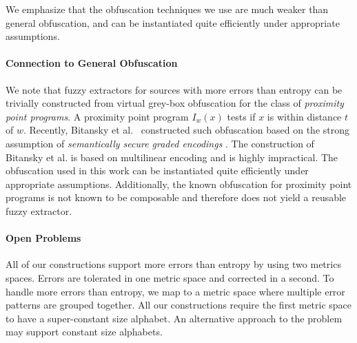 \documentclass[11pt]{article}
\newcommand{\consref}[1]{\mbox{Construction~\ref{#1}}}
\newcommand{\class}[1]{{\ensuremath{\mathsf{#1}}}}
\newcommand{\gen}{\ensuremath{\class{Gen}}\xspace}
\begin{document}

We emphasize that the obfuscation techniques we use are much weaker than general obfuscation, and can be instantiated quite efficiently under appropriate assumptions.


\paragraph{Connection to General Obfuscation}
We note that fuzzy extractors for sources with more errors than entropy can be trivially constructed from virtual grey-box obfuscation for the class of {\em proximity point programs}. A proximity point program $I_w(x)$ tests if $x$ is within distance $t$ of $w$. 
Recently, Bitansky et al.~\cite{BitanskyCKP14} constructed such obfuscation based on the strong assumption of {\em semantically secure graded encodings} \cite{PassTS13}.
The construction of Bitansky et al. is based on multilinear encoding and is  highly impractical.  The obfuscation used in this work can be instantiated quite efficiently under appropriate assumptions.
Additionally, the known obfuscation for proximity point programs is not known to be composable and therefore does not yield a reusable fuzzy extractor.

\paragraph{Open Problems}
All of our constructions support more errors than entropy by using two metrics spaces.  Errors are tolerated in one metric space and corrected in a second.  To handle more errors than entropy,  we map to a metric space where multiple error patterns are grouped together.  All our constructions require the first metric space to have a super-constant size alphabet.  An alternative approach to the problem may support constant size alphabets.
\end{document}
